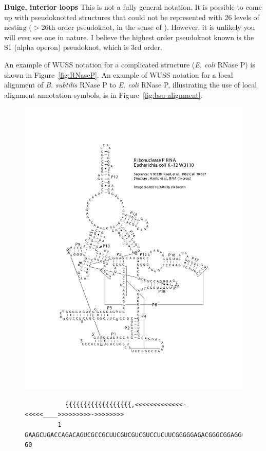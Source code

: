 \begin{sreitems}{\textbf{Bulge, interior loops}}
  This is not a fully general notation. It is possible to come up with
  pseudoknotted structures that could not be represented with 26
  levels of nesting ($>$26th order pseudoknot, in the sense of
  \citep{RivasEddy99}). However, it is unlikely you will ever see one
  in nature. I believe the highest order pseudoknot known is the S1
  (alpha operon) pseudoknot, which is 3rd order.
\end{sreitems}

An example of WUSS notation for a complicated structure
(\emph{E. coli} RNase P) is shown in Figure~\ref{fig:RNaseP}.  An
example of WUSS notation for a local alignment of \emph{B. subtilis}
RNase P to \emph{E. coli} RNase P, illustrating the use of local
alignment annotation symbols, is in Figure~\ref{fig:bsu-alignment}.

\begin{figure}[tp]
\begin{center}
\includegraphics[scale=0.6]{figures/rnaseP-ecoli}
\end{center}
\begin{center}
{\scriptsize
\begin{BVerbatim}
           {{{{{{{{{{{{{{{{{{,<<<<<<<<<<<<<-<<<<<____>>>>>>>>>->>>>>>>>
         1 GAAGCUGACCAGACAGUCGCCGCUUCGUCGUCGUCCUCUUCGGGGGAGACGGGCGGAGGG 60


\end{BVerbatim}}
\end{center}
\end{figure}
